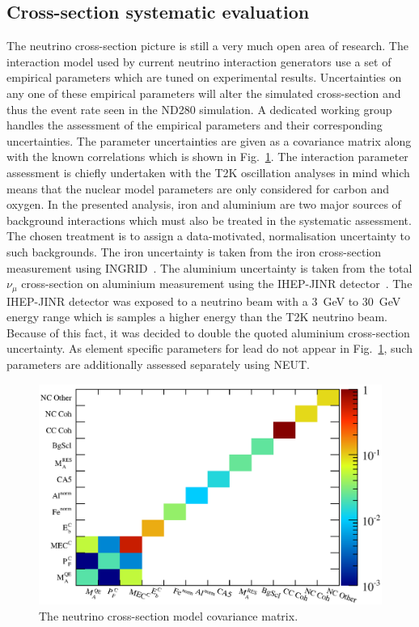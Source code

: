 \subsection{Cross-section systematic evaluation}
\label{subsec:CrossSectionSystematic}
The neutrino cross-section picture is still a very much open area of research.  The interaction model used by current neutrino interaction generators use a set of empirical parameters which are tuned on experimental results.  Uncertainties on any one of these empirical parameters will alter the simulated cross-section and thus the event rate seen in the ND280 simulation.  A dedicated working group handles the assessment of the empirical parameters and their corresponding uncertainties.  The parameter uncertainties are given as a covariance matrix along with the known correlations which is shown in Fig.~\ref{fig:XSecPredictionSyst}.  The interaction parameter assessment is chiefly undertaken with the T2K oscillation analyses in mind which means that the nuclear model parameters are only considered for carbon and oxygen.  In the presented analysis, iron and aluminium are two major sources of background interactions which must also be treated in the systematic assessment.  The chosen treatment is to assign a data-motivated, normalisation uncertainty to such backgrounds.  The iron uncertainty is taken from the iron cross-section measurement using INGRID~\cite{PhysRevD.90.052010}.  The aluminium uncertainty is taken from the total $\nu_\mu$ cross-section on aluminium measurement using the IHEP-JINR detector~\cite{Anikeev:1995dj}.  The IHEP-JINR detector was exposed to a neutrino beam with a 3~GeV to 30~GeV energy range which is samples a higher energy than the T2K neutrino beam.  Because of this fact, it was decided to double the quoted aluminium cross-section uncertainty.  As element specific parameters for lead do not appear in Fig.~\ref{fig:XSecPredictionSyst}, such parameters are additionally assessed separately using NEUT.
\begin{figure}
  \centering
  \includegraphics[width=12cm]{images/measurement/systematics/xsec/xsec_prediction_syst.eps}
  \caption{The neutrino cross-section model covariance matrix.}
  \label{fig:XSecPredictionSyst}
\end{figure}
